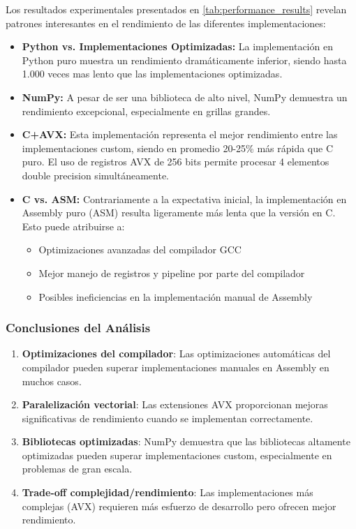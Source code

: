 \documentclass[a4paper]{article}
\begin{document}
Los resultados experimentales presentados en \ref{tab:performance_results} revelan patrones interesantes en el rendimiento de las diferentes implementaciones:
\begin{itemize}
    \item \textbf{Python vs. Implementaciones Optimizadas:} La implementación en Python puro muestra un rendimiento dramáticamente inferior, siendo hasta 1.000 veces mas lento que las implementaciones optimizadas.

    \item \textbf{NumPy:} A pesar de ser una biblioteca de alto nivel, NumPy demuestra un rendimiento excepcional, especialmente en grillas grandes. 
    
    \item \textbf{C+AVX:} Esta implementación representa el mejor rendimiento entre las implementaciones custom, siendo en promedio 20-25\% más rápida que C puro. El uso de registros AVX de 256 bits permite procesar 4 elementos double precision simultáneamente.

    \item \textbf{C vs. ASM:} Contrariamente a la expectativa inicial, la implementación en Assembly puro (ASM) resulta ligeramente más lenta que la versión en C. Esto puede atribuirse a:
    \begin{itemize}
        \item Optimizaciones avanzadas del compilador GCC
        \item Mejor manejo de registros y pipeline por parte del compilador
        \item Posibles ineficiencias en la implementación manual de Assembly
    \end{itemize}

\end{itemize}

\subsubsection{Conclusiones del Análisis}

\begin{enumerate}
    \item \textbf{Optimizaciones del compilador}: Las optimizaciones automáticas del compilador pueden superar implementaciones manuales en Assembly en muchos casos.
    \item \textbf{Paralelización vectorial}: Las extensiones AVX proporcionan mejoras significativas de rendimiento cuando se implementan correctamente.
    \item \textbf{Bibliotecas optimizadas}: NumPy demuestra que las bibliotecas altamente optimizadas pueden superar implementaciones custom, especialmente en problemas de gran escala.
    \item \textbf{Trade-off complejidad/rendimiento}: Las implementaciones más complejas (AVX) requieren más esfuerzo de desarrollo pero ofrecen mejor rendimiento.
\end{enumerate}
\end{document}
